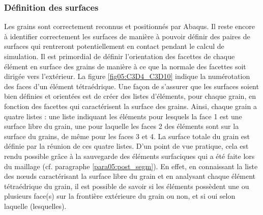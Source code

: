		\subsubsection{Définition des surfaces}
			Les grains sont correctement reconnus et positionnés par Abaqus. Il reste encore à identifier correctement les surfaces de manière à pouvoir définir des paires de surfaces qui rentreront potentiellement en contact pendant le calcul de simulation. Il est primordial de définir l'orientation des facettes de chaque élément en surface des grains de manière à ce que la normale des facettes soit dirigée vers l'extérieur. La figure \ref{fig05:C3D4_C3D10} indique la numérotation des faces d'un élément tétraédrique. Une façon de s'assurer que les surfaces soient bien définies et orientées est de créer des listes d'éléments, pour chaque grain, en fonction des facettes qui caractérisent la surface des grains. Ainsi, chaque grain a quatre listes : une liste indiquant les éléments pour lesquels la face 1 est une surface libre du grain, une pour laquelle les faces 2 des éléments sont sur la surface du grains, de même pour les faces 3 et 4. La surface totale du grain est définie par la réunion de ces quatre listes. D'un point de vue pratique, cela est rendu possible grâce à la sauvegarde des éléments surfaciques qui a été faite lors du maillage (cf. paragraphe \ref{para05:post_segm}). En effet, en connaissant la liste des n\oe{}uds caractérisant la surface libre du grain et en analysant chaque élément tétraédrique du grain, il est possible de savoir si les éléments possèdent une ou plusieurs face(s) sur la frontière extérieure du grain ou non, et si oui selon laquelle (lesquelles).
